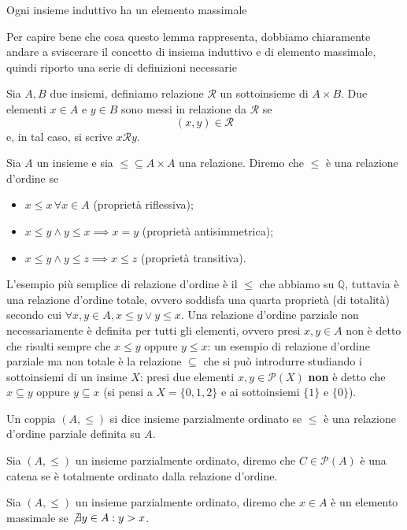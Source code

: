 \begin{lemma}
    Ogni insieme induttivo ha un elemento massimale
\end{lemma}
Per capire bene che cosa questo lemma rappresenta, dobbiamo chiaramente andare a sviscerare il concetto di insiema induttivo e di elemento massimale, quindi riporto una serie di definizioni necessarie
\begin{definition}[relazione]
    Sia $A, B$ due insiemi, definiamo relazione $\mathcal{R}$ un sottoinsieme di $A \times B$. Due elementi $x \in A$ e $y \in B$ sono messi in relazione da $\mathcal{R}$ se
    $$
        (x, y) \in \mathcal{R}
    $$
    e, in tal caso, si scrive $x \mathcal{R} y$.
\end{definition}
\begin{definition}
    Sia $A$ un insieme e sia $\leq \subseteq A \times A$ una relazione. Diremo che $\leq$ è una relazione d'ordine se
    \begin{itemize}
        \item $x \leq x \, \forall x \in A$ (proprietà riflessiva);
        \item $x \leq y \wedge y \leq x \implies x = y$ (proprietà antisimmetrica);
        \item $x \leq y \wedge y \leq z \implies x \leq z$ (proprietà transitiva).
    \end{itemize}
\end{definition}
L'esempio più semplice di relazione d'ordine è il $\leq$ che abbiamo su $\mathbb{Q}$, tuttavia è una relazione d'ordine totale, ovvero soddisfa una quarta proprietà (di totalità) secondo cui $\forall x, y \in A, x \leq y \vee y \leq x$. Una relazione d'ordine parziale non necessariamente è definita per tutti gli elementi, ovvero presi $x, y \in A$ non è detto che risulti sempre che $x \leq y$ oppure $y \leq x$: un esempio di relazione d'ordine parziale ma non totale è la relazione $\subseteq$ che si può
introdurre studiando i sottoinsiemi di un insime $X$: presi due elementi $x, y \in \mathcal{P}(X)$ \textbf{non} è detto che $x \subseteq y$ oppure $y \subseteq x$ (si pensi a $X = \{ 0, 1, 2 \}$ e ai sottoinsiemi $\{ 1 \}$ e $\{ 0 \}$).
\begin{definition}
    Un coppia $(A, \leq)$ si dice insieme parzialmente ordinato se $\leq$ è una relazione d'ordine parziale definita su $A$.
\end{definition}
\begin{definition}[catena]
    Sia $(A, \leq)$ un insieme parzialmente ordinato, diremo che $C \in \mathcal{P}(A)$ è una catena se è totalmente ordinato dalla relazione d'ordine.
\end{definition}
\begin{definition}
    Sia $(A, \leq)$ un insieme parzialmente ordinato, diremo che $x \in A$ è un elemento massimale se $\not\exists y \in A: y > x$.
\end{definition}